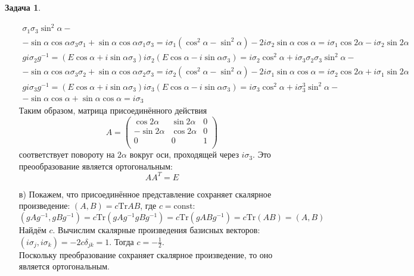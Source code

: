 \documentclass[12pt]{article}
\theoremstyle{definition}
\newtheorem{zad}{Задача}[section]
\begin{document}
\begin{zad}
\begin{itemize}
\begin{multline*}
        \sigma_1\sigma_3\sin^2\alpha-\\-\sin\alpha\cos\alpha\sigma_3\sigma_1+\sin\alpha\cos\alpha\sigma_1\sigma_3=i\sigma_1(\cos^2\alpha-\sin^2\alpha)-2i\sigma_2\sin\alpha\cos\alpha=i\sigma_1\cos2\alpha-i\sigma_2\sin 2\alpha
    \end{multline*}
    \begin{multline*}
        gi\sigma_2g^{-1}=(E\cos\alpha+i\sin\alpha\sigma_3)i\sigma_2(E\cos\alpha-i\sin\alpha\sigma_3)=i\sigma_2\cos^2\alpha+i\sigma_3
        \sigma_2\sigma_3\sin^2\alpha-\\-\sin\alpha\cos\alpha\sigma_3\sigma_2+\sin\alpha\cos\alpha\sigma_2\sigma_3=i\sigma_2(\cos^2\alpha-\sin^2\alpha)-2i\sigma_1\sin\alpha\cos\alpha=i\sigma_2\cos2\alpha+i\sigma_1\sin 2\alpha
    \end{multline*}
    \begin{multline*}
        gi\sigma_3g^{-1}=(E\cos\alpha+i\sin\alpha\sigma_3)i\sigma_3(E\cos\alpha-i\sin\alpha\sigma_3)=i\sigma_3\cos^2\alpha+i\sigma_3^3\sin^2\alpha-\\-\sin\alpha\cos\alpha+\sin\alpha\cos\alpha=i\sigma_3
    \end{multline*}
    Таким образом, матрица присоединённого действия
    \begin{equation}
        \boxed{A=\left(
    \begin{array}{ccc}
    \cos 2\alpha & \sin2\alpha & 0\\
    -\sin 2\alpha & \cos2\alpha & 0\\
    0 & 0 & 1\\
    \end{array}
    \right)}
    \end{equation}
    соответствует повороту на $2\alpha$ вокруг оси, проходящей через $i\sigma_3$.
    Это преообразование является ортогональным:
    \begin{equation}
        AA^T=E
    \end{equation}
    \item[в)] Покажем, что присоединённое представление сохраняет скалярное произведение: $(A,B)=c\text{Tr}AB$, где $c=\text{const}$:
    \begin{equation}
        (gAg^{-1},gBg^{-1})=c\text{Tr}(gAg^{-1}gBg^{-1})=c\text{Tr}(gABg^{-1})=c\text{Tr}(AB)=(A,B)
    \end{equation}
    Найдём $c$. Вычислим скалярные произведения базисных векторов: $(i\sigma_j,i\sigma_k)=-2c\delta_{jk}=1$. Тогда $c=-\frac{1}{2}$.\\
    Поскольку преобразование сохраняет скалярное произведение, то оно является ортогональным.

\end{itemize}
\end{zad}
\end{document}
